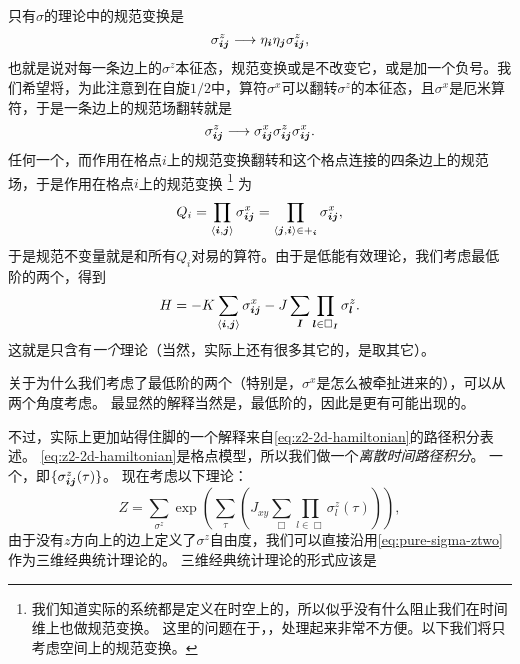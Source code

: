 只有$\sigma$的理论中的规范变换是
\begin{equation}
    {\sigma}_{\vb*{i} \vb*{j}}^z \longrightarrow \eta_{\vb*{i}} \eta_{\vb*{j}} {\sigma}_{\vb*{i} \vb*{j}}^z,
    \label{eq:pure-sigma-ztwo}
\end{equation}
也就是说对每一条边上的${\sigma}^z$本征态，规范变换或是不改变它，或是加一个负号。我们希望将，为此注意到在自旋$1/2$中，算符${\sigma}^x$可以翻转${\sigma}^z$的本征态，且${\sigma}^x$是厄米算符，于是一条边上的规范场翻转就是
\[
    {\sigma}_{\vb*{i} \vb*{j}}^z \longrightarrow {\sigma}^x_{\vb*{i} \vb*{j}} {\sigma}_{\vb*{i} \vb*{j}}^z {\sigma}^x_{\vb*{i} \vb*{j}}.
\]
任何一个，而作用在格点$i$上的规范变换翻转和这个格点连接的四条边上的规范场，于是作用在格点$i$上的规范变换
\footnote{
    我们知道实际的系统都是定义在时空上的，所以似乎没有什么阻止我们在时间维上也做规范变换。
    这里的问题在于，，处理起来非常不方便。以下我们将只考虑空间上的规范变换。
}%
为
\begin{equation}
    {Q}_i = \prod_{\langle \vb*{i}, \vb*{j} \rangle} {\sigma}^x_{\vb*{i} \vb*{j}} = \prod_{\langle \vb*{j}, \vb*{i} \rangle \in +_{\vb*{i}}} {\sigma}^x_{\vb*{i} \vb*{j}},
    \label{eq:z2-charge}
\end{equation}
于是规范不变量就是和所有${Q}_i$对易的算符。由于是低能有效理论，我们考虑最低阶的两个，得到
\begin{equation}
    {H} = - K \sum_{\langle \vb*{i}, \vb*{j} \rangle} {\sigma}^x_{\vb*{i} \vb*{j}} - J \sum_{\vb*{I}} \prod_{\vb*{l} \in \Box_{\vb*{I}}} {\sigma}^z_{\vb*{l}}.
    \label{eq:z2-2d-hamiltonian}
\end{equation}
这就是只含有\emph{一个}理论（当然，实际上还有很多其它的，是取其它）。

关于为什么我们考虑了最低阶的两个（特别是，${\sigma}^x$是怎么被牵扯进来的），可以从两个角度考虑。
最显然的解释当然是，最低阶的，因此是更有可能出现的。

不过，实际上更加站得住脚的一个解释来自\eqref{eq:z2-2d-hamiltonian}的路径积分表述。
\eqref{eq:z2-2d-hamiltonian}是格点模型，所以我们做一个\emph{离散时间路径积分}。
一个，即$\{\sigma^z_{\vb*{i} \vb*{j}}(\tau)\}$。
现在考虑以下理论：
\begin{equation}
    Z = \sum_{\sigma^z} \exp(\sum_{\tau} (J_{xy} \sum_{\Box} \prod_{l \in \Box} \sigma_l^z(\tau)  ) ),
\end{equation}
由于没有$z$方向上的边上定义了$\sigma^z$自由度，我们可以直接沿用\eqref{eq:pure-sigma-ztwo}作为三维经典统计理论的。
三维经典统计理论的形式应该是


